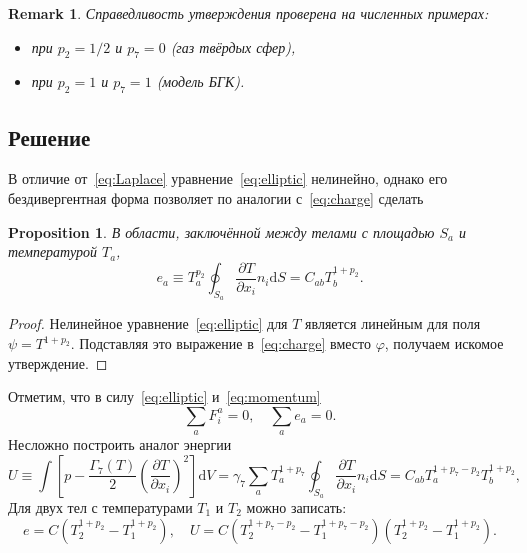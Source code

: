 \documentclass{article}
\theoremstyle{plain}
\newtheorem{proposition}{Proposition}
\newtheorem{remark}{Remark}
\newcommand{\dd}{\mathrm{d}}
\newcommand{\pder}[2][]{\frac{\partial#1}{\partial#2}}
\newcommand{\eqdef}{\equiv}
\begin{document}
\begin{remark}
    Справедливость утверждения проверена на численных примерах:
    \begin{itemize}
        \item при \(p_2=1/2\) и \(p_7=0\) (газ твёрдых сфер),
        \item при \(p_2=1\) и \(p_7=1\) (модель БГК).
    \end{itemize}
\end{remark}

\subsection{Решение}

В отличие от~\eqref{eq:Laplace} уравнение~\eqref{eq:elliptic} нелинейно, однако его бездивергентная форма
позволяет по аналогии с~\eqref{eq:charge} сделать
\begin{proposition}
    В области, заключённой между телами с площадью \(S_a\) и температурой \(T_a\),
    \begin{equation}\label{eq:charge_ell}
        e_a \eqdef T_a^{p_2} \oint_{S_a} \pder[T]{x_i}n_i\dd{S} = C_{ab} T_b^{1+p_2}.
    \end{equation}
\end{proposition}
\begin{proof}
     Нелинейное уравнение~\eqref{eq:elliptic} для \(T\) является линейным для поля \(\psi=T^{1+p_2}\).
     Подставляя это выражение в~\eqref{eq:charge} вместо \(\varphi\), получаем искомое утверждение.
\end{proof}
Отметим, что в силу~\eqref{eq:elliptic} и~\eqref{eq:momentum}
\begin{equation}\label{eq:closed}
    \sum_a F^a_i = 0, \quad \sum_a e_a = 0.
\end{equation}
Несложно построить аналог энергии
\begin{equation}\label{eq:energy_ell}
    U \eqdef \int \left[ p - \frac{\Gamma_7(T)}2\left(\pder[T]{x_i}\right)^2 \right]\dd{V} =
    \gamma_7 \sum_a T_a^{1+p_7} \oint_{S_a} \pder[T]{x_i}n_i\dd{S} =
    C_{ab} T_a^{1+p_7-p_2} T_b^{1+p_2},
\end{equation}
Для двух тел с температурами \(T_1\) и \(T_2\) можно записать:
\begin{equation}\label{eq:two_bodies}
    e = C \left( T_2^{1+p_2} - T_1^{1+p_2} \right), \quad
    U = C \left( T_2^{1+p_7-p_2} - T_1^{1+p_7-p_2} \right)\left( T_2^{1+p_2} - T_1^{1+p_2} \right).
\end{equation}
\end{document}
